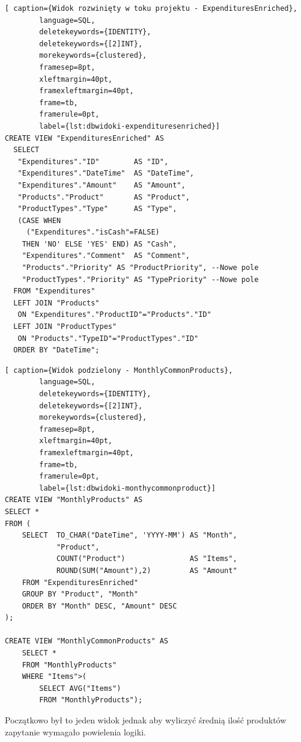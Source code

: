 \documentclass[a4paper,10pt, twoside]{report}
\begin{document}
\begin{large}
\begin{minipage}{\textwidth}
    \begin{lstlisting}[ caption={Widok rozwinięty w toku projektu - ExpendituresEnriched},
        language=SQL,
        deletekeywords={IDENTITY},
        deletekeywords={[2]INT},
        morekeywords={clustered},
        framesep=8pt,
        xleftmargin=40pt,
        framexleftmargin=40pt,
        frame=tb,
        framerule=0pt,
        label={lst:dbwidoki-expendituresenriched}]
CREATE VIEW "ExpendituresEnriched" AS
  SELECT
   "Expenditures"."ID"        AS "ID",
   "Expenditures"."DateTime"  AS "DateTime",
   "Expenditures"."Amount"    AS "Amount",
   "Products"."Product"       AS "Product",
   "ProductTypes"."Type"      AS "Type",
   (CASE WHEN 
     ("Expenditures"."isCash"=FALSE)
    THEN 'NO' ELSE 'YES' END) AS "Cash",
    "Expenditures"."Comment"  AS "Comment",
    "Products"."Priority" AS "ProductPriority", --Nowe pole
    "ProductTypes"."Priority" AS "TypePriority" --Nowe pole
  FROM "Expenditures"
  LEFT JOIN "Products"
   ON "Expenditures"."ProductID"="Products"."ID"
  LEFT JOIN "ProductTypes"
   ON "Products"."TypeID"="ProductTypes"."ID"
  ORDER BY "DateTime";\end{lstlisting}
\end{minipage}

\begin{minipage}{\textwidth}
    \begin{lstlisting}[ caption={Widok podzielony - MonthlyCommonProducts},
        language=SQL,
        deletekeywords={IDENTITY},
        deletekeywords={[2]INT},
        morekeywords={clustered},
        framesep=8pt,
        xleftmargin=40pt,
        framexleftmargin=40pt,
        frame=tb,
        framerule=0pt,
        label={lst:dbwidoki-monthycommonproduct}]
CREATE VIEW "MonthlyProducts" AS
SELECT *
FROM (
    SELECT  TO_CHAR("DateTime", 'YYYY-MM') AS "Month",
            "Product",
            COUNT("Product")               AS "Items", 
            ROUND(SUM("Amount"),2)         AS "Amount"
    FROM "ExpendituresEnriched"
    GROUP BY "Product", "Month"
    ORDER BY "Month" DESC, "Amount" DESC
);

CREATE VIEW "MonthlyCommonProducts" AS
    SELECT *
    FROM "MonthlyProducts" 
    WHERE "Items">(
        SELECT AVG("Items")
        FROM "MonthlyProducts");\end{lstlisting}
\end{minipage}
{Początkowo był to jeden widok jednak aby wyliczyć średnią ilość produktów 
zapytanie wymagało powielenia logiki.}


\end{large}
\end{document}

